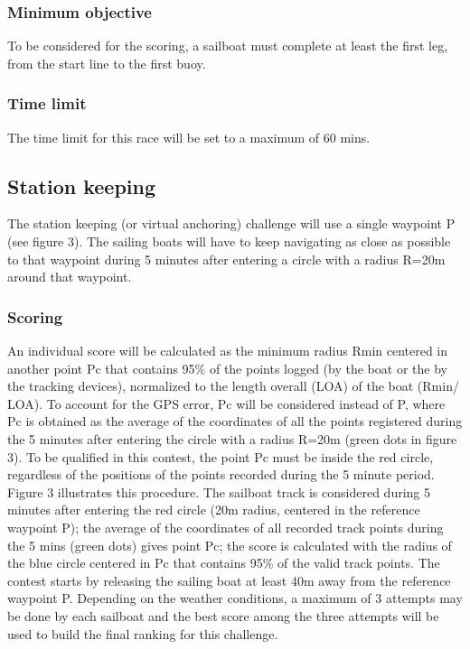 \documentclass[12pt]{article}
\begin{document}
\subsubsection{Minimum objective}
To be considered for the scoring, a sailboat must complete at least the first
leg, from the start
line to the first buoy.

\subsubsection{Time limit}

The time limit for this race will be set to a maximum of 60 mins.

\subsection{Station keeping}
The station keeping (or virtual anchoring) challenge will use a single waypoint P
(see figure 3).
The sailing boats will have to keep navigating as close as possible to that
waypoint during 5
minutes after entering a circle with a radius R=20m around that waypoint.

\subsubsection{Scoring}
An individual score will be calculated as the minimum radius Rmin centered in
another point Pc that contains 95\% of the points logged (by the boat or the by the tracking
devices), normalized to the length overall (LOA) of the boat (Rmin/ LOA). 
To account for the GPS error, Pc will be
considered instead of P, where Pc is obtained as the average of the coordinates
of all the points
registered during the 5 minutes after entering the circle with a radius R=20m
(green dots in
figure 3). To be qualified in this contest, the point Pc must be inside the red
circle, regardless
of the positions of the points recorded during the 5 minute period.
Figure 3 illustrates this procedure. The sailboat track is considered during 5
minutes after
entering the red circle (20m radius, centered in the reference waypoint P); the
average of the
coordinates of all recorded track points during the 5 mins (green dots) gives
point Pc; the score
is calculated with the radius of the blue circle centered in Pc that contains
95\% of the valid
track points. The contest starts by releasing the sailing boat at least 40m away
from the
reference waypoint P. Depending on the weather conditions, a maximum of 3
attempts may be
done by each sailboat and the best score among the three attempts will be used
to build the
final ranking for this challenge.
\end{document}
